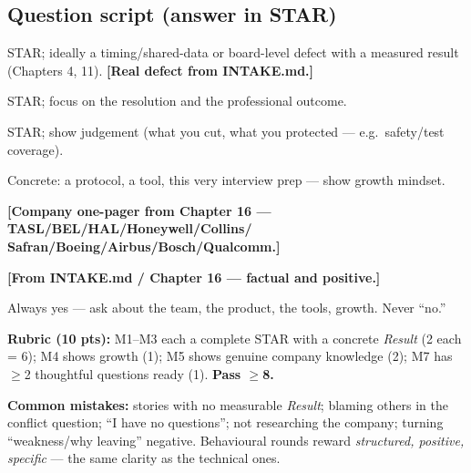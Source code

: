 \subsection*{Question script (answer in STAR)}
STAR; ideally a timing/shared-data or board-level defect with a measured result
(Chapters 4, 11). \textbf{[Real defect from INTAKE.md.]}

STAR; focus on the resolution and the professional outcome.

STAR; show judgement (what you cut, what you protected --- e.g.\ safety/test
coverage).

Concrete: a protocol, a tool, this very interview prep --- show growth mindset.

\textbf{[Company one-pager from Chapter 16 --- TASL/BEL/HAL/Honeywell/Collins/
Safran/Boeing/Airbus/Bosch/Qualcomm.]}

\textbf{[From INTAKE.md / Chapter 16 --- factual and positive.]}

Always yes --- ask about the team, the product, the tools, growth. Never ``no.''

\begin{scorecard}
\textbf{Rubric (10 pts):} M1--M3 each a complete STAR with a concrete
\emph{Result} (2 each = 6); M4 shows growth (1); M5 shows genuine company
knowledge (2); M7 has $\ge$2 thoughtful questions ready (1). \textbf{Pass
$\ge$8.}
\end{scorecard}

\textbf{Common mistakes:} stories with no measurable \emph{Result}; blaming
others in the conflict question; ``I have no questions''; not researching the
company; turning ``weakness/why leaving'' negative. Behavioural rounds reward
\emph{structured, positive, specific} --- the same clarity as the technical
ones.

